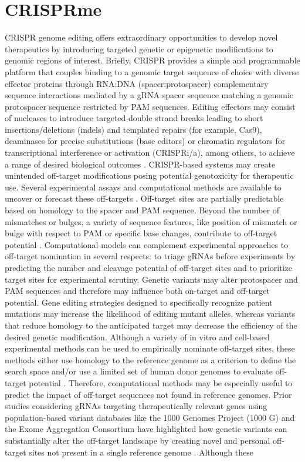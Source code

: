\documentclass[a4paper, titlepage, openright]{book}
\newcommand{\crisprme}{CRISPRme\xspace}
\begin{document}
\section{\crisprme}
CRISPR genome editing offers extraordinary opportunities to develop novel therapeutics by introducing targeted genetic or epigenetic modifications to genomic regions of interest. Briefly, CRISPR provides a simple and programmable platform that couples binding to a genomic target sequence of choice with diverse effector proteins through RNA:DNA (spacer:protospacer) complementary sequence interactions mediated by a gRNA spacer sequence matching a genomic protospacer sequence restricted by PAM sequences. Editing effectors may consist of nucleases to introduce targeted double strand breaks leading to short insertions/deletions (indels) and templated repairs (for example, Cas9), deaminases for precise substitutions (base editors) or chromatin regulators for transcriptional interference or activation (CRISPRi/a), among others, to achieve a range of desired biological outcomes \citep{anzalone2020genome}. CRISPR-based systems may create unintended off-target modifications posing potential genotoxicity for therapeutic use. Several experimental assays and computational methods are available to uncover or forecast these off-targets \citep{clement2020technologies}. Off-target sites are partially predictable based on homology to the spacer and PAM sequence. Beyond the number of mismatches or bulges, a variety of sequence features, like position of mismatch or bulge with respect to PAM or specific base changes, contribute to off-target potential \citep{clement2020technologies, bao2021tools, hsu2013dna, doench2016optimized}. Computational models can complement experimental approaches to off-target nomination in several respects: to triage gRNAs before experiments by predicting the number and cleavage potential of off-target sites and to prioritize target sites for experimental scrutiny. Genetic variants may alter protospacer and PAM sequences and therefore may influence both on-target and off-target potential. Gene editing strategies designed to specifically recognize patient mutations may increase the likelihood of editing mutant alleles, whereas variants that reduce homology to the anticipated target may decrease the efficiency of the desired genetic modification. Although a variety of in vitro and cell-based experimental methods can be used to empirically nominate off-target sites, these methods either use homology to the reference genome as a criterion to define the search space and/or use a limited set of human donor genomes to evaluate off-target potential \citep{bao2021tools, chaudhari2020evaluation}. Therefore, computational methods may be especially useful to predict the impact of off-target sequences not found in reference genomes. Prior studies considering gRNAs targeting therapeutically relevant genes using population-based variant databases like the 1000 Genomes Project (1000 G) and the Exome Aggregation Consortium have highlighted how genetic variants can substantially alter the off-target landscape by creating novel and personal off-target sites not present in a single reference genome \citep{lessard2017human, scott2017implications}. Although these 
\end{document}
